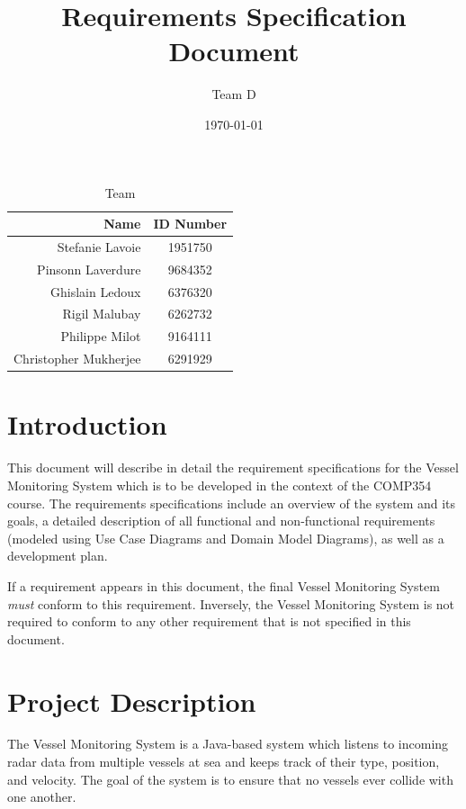 \documentclass{article}
\begin{document}
\title{Requirements Specification Document}
\author{Team D}
\date{\today}

\maketitle

\vspace*{1.5in}
\begin{table}[htbp]
\caption{Team}
\begin{center}
\begin{tabular}{|r | c|}
\hline
Name & ID Number \\
\hline\hline
Stefanie Lavoie & 1951750 \\
Pinsonn Laverdure & 9684352 \\
Ghislain Ledoux & 6376320 \\
Rigil Malubay & 6262732 \\
Philippe Milot & 9164111 \\
Christopher Mukherjee & 6291929 \\
\hline
\end{tabular}
\end{center}
\end{table}

\clearpage

\section{Introduction} %

This document will describe in detail the requirement specifications for the Vessel Monitoring System which is to be developed in the context of the COMP354 course. The requirements specifications include an overview of the system and its goals, a detailed description of all functional and non-functional requirements (modeled using Use Case Diagrams and Domain Model Diagrams), as well as a development plan. 

If a requirement appears in this document, the final Vessel Monitoring System \emph{must} conform to this requirement. Inversely, the Vessel Monitoring System is not required to conform to any other requirement that is not specified in this document.

\section{Project Description} %

The Vessel Monitoring System is a Java-based system which listens to incoming radar data from multiple vessels at sea and keeps track of their type, position, and velocity. The goal of the system is to ensure that no vessels ever collide with one another.
\end{document}
